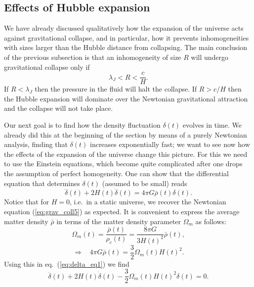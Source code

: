 \subsection{Effects of Hubble expansion}

We have already discussed qualitatively how the expansion of the universe acts against gravitational collapse, and in particular, how it prevents inhomogeneities with sizes larger than the Hubble distance from collapsing. The main conclusion of the previous subsection is that an inhomogeneity of size $R$ will undergo gravitational collapse only if
\begin{equation}
\lambda_J<R<\frac{c}{H}.
\end{equation}
If $R<\lambda_J$ then the pressure in the fluid will halt the collapse. If $R>c/H$ then the Hubble expansion will dominate over the Newtonian gravitational attraction and the collapse will not take place.

Our next goal is to find how the density fluctuation $\delta(t)$ evolves in time. We already did this at the beginning of the section by means of a purely Newtonian analysis, finding that $\delta(t)$ increases exponentially fast; we want to see now how the effects of the expansion of the universe change this picture. For this we need to use the Einstein equations, which become quite complicated after one drops the assumption of perfect homogeneity. One can show that the differential equation that determines $\delta(t)$ (assumed to be small) reads
\begin{equation} \label{eq:delta_eq1}
\ddot{\delta}(t)+2H(t)\dot{\delta}(t)=4\pi G\bar{\rho}(t)\delta(t).
\end{equation}
Notice that for $H=0$, i.e.\ in a static universe, we recover the Newtonian equation (\ref{eq:grav_coll5}) as expected. It is convenient to express the average matter density $\bar{\rho}$ in terms of the matter density parameter $\Omega_m$ as follows:
\begin{equation}
\Omega_m(t)=\frac{\bar{\rho}(t)}{\rho_c(t)}=\frac{8\pi G}{3H(t)^2}\bar{\rho}(t),
\end{equation}
\begin{equation}
\Rightarrow~~~~ 4\pi G\bar{\rho}(t)=\frac{3}{2}\Omega_m(t)H(t)^2.
\end{equation}
Using this in eq.\ (\ref{eq:delta_eq1}) we find
\begin{equation} \label{eq:delta_eq2}
\ddot{\delta}(t)+2H(t)\dot{\delta}(t)-\frac{3}{2}\Omega_m(t)H(t)^2\delta(t)=0.
\end{equation}

